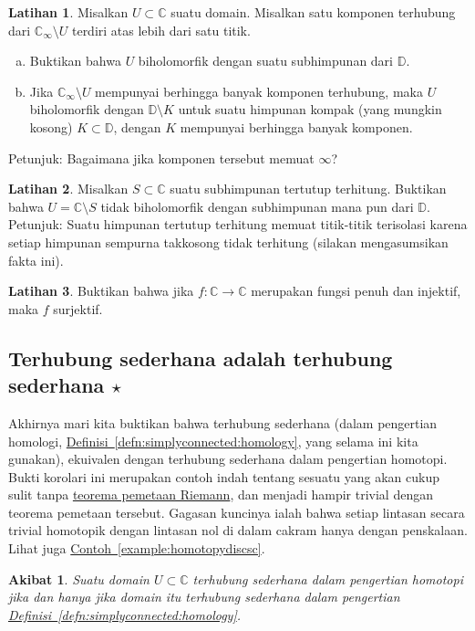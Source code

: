 \documentclass[12pt,openany]{book}
\newcommand{\C}{{\mathbb{C}}}
\newcommand{\D}{{\mathbb{D}}}
\theoremstyle{plain}
\newtheorem{cor}[thm]{Akibat}
\theoremstyle{remark}
\theoremstyle{definition}
\newenvironment{exbox}{%
    \def\FrameCommand{\vrule width 1pt \relax\hspace{10pt}}%
    \MakeFramed{\advance\hsize-\width\FrameRestore}%
}{%
    \endMakeFramed
}
\newenvironment{exparts}{%
    \leavevmode\begin{enumerate}[a),noitemsep,topsep=0pt,parsep=0pt,partopsep=0pt]
}{%
    \end{enumerate}
}
\theoremstyle{exercise}
\newtheorem{exercise}{Latihan}[section]
\theoremstyle{example}
\newcommand{\exampleref}[1]{\hyperref[#1]{Contoh~\ref*{#1}}}
\newcommand{\defnref}[1]{\hyperref[#1]{Definisi~\ref*{#1}}}
\begin{document}
\begin{exbox}
\begin{exercise}
Misalkan $U \subset \C$ suatu domain. Misalkan satu komponen terhubung dari $\C_\infty
\setminus U$ terdiri atas lebih dari satu titik.
\begin{exparts}
\item
Buktikan bahwa $U$ biholomorfik dengan suatu subhimpunan dari $\D$.
\item
Jika $\C_\infty \setminus U$ mempunyai berhingga banyak komponen terhubung, maka
$U$ biholomorfik dengan $\D \setminus K$ untuk suatu himpunan kompak (yang mungkin kosong)
$K \subset \D$, dengan $K$ mempunyai berhingga banyak komponen.
\end{exparts}
Petunjuk: Bagaimana jika komponen tersebut memuat $\infty$?
\end{exercise}

\begin{exercise}
Misalkan $S \subset \C$ suatu subhimpunan tertutup terhitung.
Buktikan bahwa $U = \C \setminus S$ tidak biholomorfik
dengan subhimpunan mana pun dari $\D$. Petunjuk: Suatu himpunan tertutup terhitung memuat titik-titik terisolasi
karena setiap himpunan sempurna takkosong tidak terhitung
(silakan mengasumsikan fakta ini).
\end{exercise}

\begin{exercise}
Buktikan bahwa
jika $f \colon \C \to \C$ merupakan fungsi penuh dan injektif, maka $f$
surjektif.
\end{exercise}
\end{exbox}

\subsection{Terhubung sederhana adalah terhubung sederhana \texorpdfstring{$\star$}{*}}

Akhirnya mari kita buktikan bahwa terhubung sederhana (dalam pengertian homologi,
\defnref{defn:simplyconnected:homology}, yang selama ini kita gunakan),
ekuivalen dengan terhubung sederhana dalam pengertian homotopi.
Bukti korolari ini merupakan contoh indah tentang sesuatu yang akan
cukup sulit tanpa
\hyperref[thm:RMT]{teorema pemetaan Riemann}, dan menjadi hampir
trivial dengan teorema pemetaan tersebut.
Gagasan kuncinya ialah bahwa setiap lintasan secara trivial homotopik dengan lintasan nol di
dalam cakram hanya dengan penskalaan. Lihat juga \exampleref{example:homotopydiscsc}.

\begin{cor} \label{cor:simplyconnhard}
Suatu domain $U \subset \C$ terhubung sederhana dalam pengertian homotopi
jika dan hanya jika
domain itu terhubung sederhana dalam pengertian \defnref{defn:simplyconnected:homology}.
\end{cor}
\end{document}
